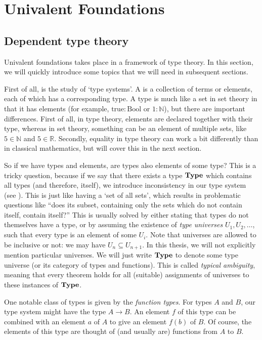 \chapter{Univalent Foundations}

\section{Dependent type theory}
Univalent foundations takes place in a framework of type theory. In this section, we will quickly introduce some topics that we will need in subsequent sections.

First of all,  is the study of `type systems'. A  is a collection of terms or elements, each of which has a corresponding type. A type is much like a set in set theory in that it has elements (for example, $ \mathrm{true}: \mathrm{Bool} $ or $ 1: \mathbb N $), but there are important differences. First of all, in type theory, elements are declared together with their type, whereas in set theory, something can be an element of multiple sets, like $ 5 \in \mathbb N $ and $ 5 \in \mathbb R $. Secondly, equality in type theory can work a bit differently than in classical mathematics, but will cover this in the next section.

So if we have types and elements, are types also elements of some type? This is a tricky question, because if we say that there exists a type $ \mathbf{Type} $ which contains all types (and therefore, itself), we introduce inconsistency in our type system (see \cite{girard}). This is just like having a `set of all sets', which results in problematic questions like ``does its subset, containing only the sets which do not contain itself, contain itself?'' This is usually solved by either stating that types do not themselves have a type, or by assuming the existence of \textit{type universes} $ U_1, U_2, \dots $, such that every type is an element of some $ U_i $. Note that universes are allowed to be inclusive or not: we may have $ U_n \subseteq U_{n + 1} $. In this thesis, we will not explicitly mention particular universes. We will just write $ \mathbf{Type} $ to denote some type universe (or its category of types and functions). This is called \textit{typical ambiguity}, meaning that every theorem holds for all (suitable) assignments of universes to these instances of $ \mathbf{Type} $.

One notable class of types is given by the \textit{function types}. For types $ A $ and $ B $, our type system might have the type $ A \to B $. An element $ f $ of this type can be combined with an element $ a $ of $ A $ to give an element $ f(b) $ of $ B $. Of course, the elements of this type are thought of (and usually are) functions from $ A $ to $ B $.

